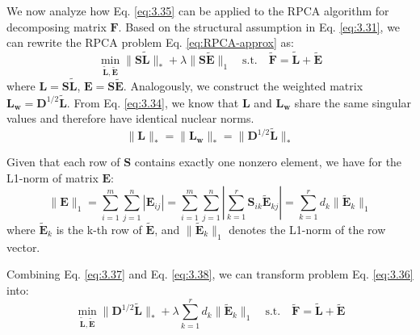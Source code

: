 \documentclass[10pt,twocolumn,letterpaper]{article}
\begin{document}
We now analyze how Eq. \eqref{eq:3.35} can be applied to the RPCA algorithm for decomposing matrix $\mathbf{F}$. Based on the structural assumption in Eq. \eqref{eq:3.31}, we can rewrite the RPCA problem Eq. \eqref{eq:RPCA-approx} as:
\begin{equation}
    \min_{\tilde{\mathbf{L}}, \tilde{\mathbf{E}}} \|\mathbf{S} \tilde{\mathbf{L}}\|_* + \lambda \|\mathbf{S} \tilde{\mathbf{E}}\|_1 \quad \text{s.t.} \quad \tilde{\mathbf{F}} = \tilde{\mathbf{L}} + \tilde{\mathbf{E}}
    \label{eq:3.36}
\end{equation}
where $\mathbf{L} = \mathbf{S}\tilde{\mathbf{L}}$, $\mathbf{E} = \mathbf{S}\tilde{\mathbf{E}}$. Analogously, we construct the weighted matrix $\mathbf{L_w}=\mathbf{D}^{1/2} \tilde{\mathbf{L}}$. From Eq. \eqref{eq:3.34}, we know that $\mathbf{L}$ and $\mathbf{L_w}$ share the same singular values and therefore have identical nuclear norms.
\begin{equation}
    \|\mathbf{L}\|_* = \|\mathbf{L_w}\|_* = \|\mathbf{D}^{1/2} \tilde{\mathbf{L}}\|_*
    \label{eq:3.37}
\end{equation}

Given that each row of $\mathbf{S}$ contains exactly one nonzero element, we have for the L1-norm of matrix $\mathbf{E}$:
\begin{equation}
    \|\mathbf{E}\|_1 = \sum_{i=1}^m \sum_{j=1}^n |\mathbf{E}_{ij}| = \sum_{i=1}^m \sum_{j=1}^n \left| \sum_{k=1}^r \mathbf{S}_{ik} \tilde{\mathbf{E}}_{kj} \right| = \sum_{k=1}^r d_k \|\tilde{\mathbf{E}}_{k}\|_1
    \label{eq:3.38}
\end{equation}
where $\tilde{\mathbf{E}}_{k}$ is the k-th row of $\tilde{\mathbf{E}}$, and $\|\tilde{\mathbf{E}}_{k}\|_1$ denotes the L1-norm of the row vector.

Combining Eq. \eqref{eq:3.37} and Eq. \eqref{eq:3.38}, we can transform problem Eq. \eqref{eq:3.36} into:
\begin{equation}
    \min_{\tilde{\mathbf{L}}, \tilde{\mathbf{E}}} \|\mathbf{D}^{1/2} \tilde{\mathbf{L}}\|_* + \lambda \sum_{k=1}^r d_k \|\tilde{\mathbf{E}}_{k}\|_1 \quad \text{s.t.} \quad \tilde{\mathbf{F}} = \tilde{\mathbf{L}} + \tilde{\mathbf{E}}
    \label{eq:3.39}
\end{equation}




\end{document}
